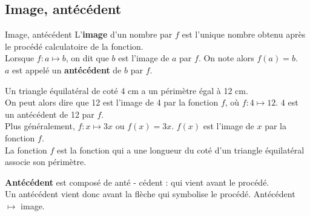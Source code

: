 \begin{pageCours}
 
\section{Image, antécédent}


\begin{DefT}{Image, antécédent}
L'\textbf{image}  d'un nombre par $f$ est l'unique nombre obtenu après le procédé calculatoire de la fonction.\\ Lorsque $f : a \longmapsto b$, on dit que $b$ est l'image de $a$ par $f$. On note alors $f(a)=b$. \\
$a$ est appelé un  \textbf{antécédent} de $b$ par $f$.
\end{DefT}

\begin{Ex}
Un triangle équilatéral de coté 4 cm a un périmètre égal à 12 cm. \\
On peut alors dire que 12 est l'image de 4 par la fonction $f$, où $f : 4 \mapsto 12$. $4$ est un antécédent de 12 par $f$.\\Plus généralement, $f : x \mapsto 3x$ ou $f(x)=3x$. $f(x)$ est l'image de $x$ par la fonction $f$.\\
La fonction $f$ est la fonction qui a une longueur du coté d'un triangle équilatéral associe son périmètre.
\end{Ex}

\begin{Ety}
\textbf{Antécédent} est composé de anté - cédent : qui vient avant le procédé. \\Un antécédent vient donc avant la flèche qui symbolise  le procédé. Antécédent $\mapsto$  image.
\end{Ety}
 





\end{pageCours} 

